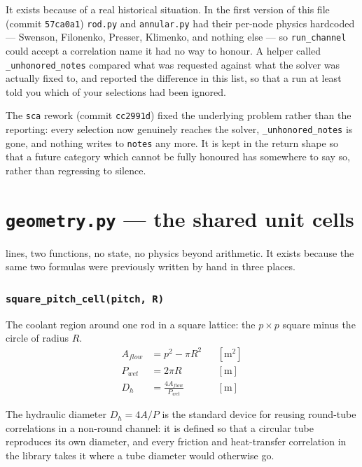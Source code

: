 \documentclass[11pt]{article}
\newcommand{\code}[1]{\texttt{#1}}
\begin{document}
It exists because of a real historical situation. In the first version of this file
(commit \code{57ca0a1}) \code{rod.py} and \code{annular.py} had their per-node physics
hardcoded --- Swenson, Filonenko, Presser, Klimenko, and nothing else --- so
\code{run\_channel} could accept a correlation name it had no way to honour. A helper
called \code{\_unhonored\_notes} compared what was requested against what the solver was
actually fixed to, and reported the difference in this list, so that a run at least told
you which of your selections had been ignored.

The \code{sca} rework (commit \code{cc2991d}) fixed the underlying problem rather than
the reporting: every selection now genuinely reaches the solver, \code{\_unhonored\_notes}
is gone, and nothing writes to \code{notes} any more. It is kept in the return shape so
that a future category which cannot be fully honoured has somewhere to say so, rather
than regressing to silence.

\newpage
\part{\code{geometry.py} --- the shared unit cells}

 lines, two functions, no state, no physics beyond arithmetic. It exists because the
same two formulas were previously written by hand in three places.

\section{\code{square\_pitch\_cell(pitch, R)}}

The coolant region around one rod in a square lattice: the $p \times p$ square minus the
circle of radius $R$.
\begin{align}
A_{flow} &= p^2 - \pi R^2 & &[\mathrm{m^2}] \\
P_{wet}  &= 2\pi R        & &[\mathrm{m}] \\
D_h      &= \frac{4 A_{flow}}{P_{wet}} & &[\mathrm{m}]
\end{align}

The hydraulic diameter $D_h = 4A/P$ is the standard device for reusing round-tube
correlations in a non-round channel: it is defined so that a circular tube reproduces its
own diameter, and every friction and heat-transfer correlation in the library takes it
where a tube diameter would otherwise go.
\end{document}
